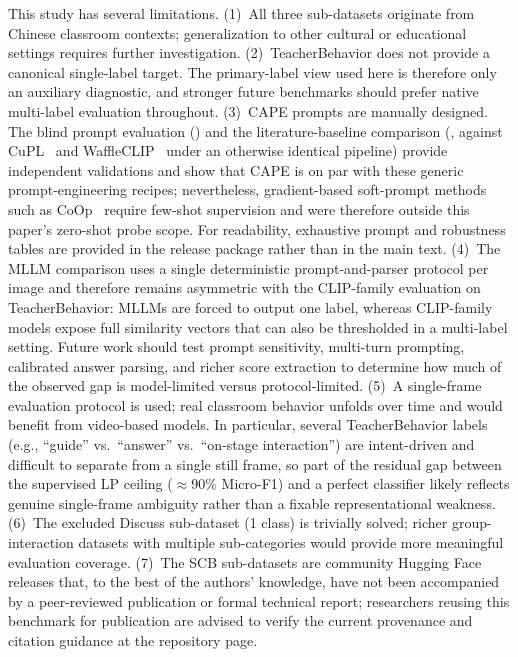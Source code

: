 \documentclass[electronics,article,submit,pdftex,moreauthors]{Definitions/mdpi}
\begin{document}
This study has several limitations.
\label{sec:limitations}
(1)~All three sub-datasets originate from Chinese classroom contexts; generalization to other cultural or educational settings requires further investigation.
(2)~TeacherBehavior does not provide a canonical single-label target. The primary-label view used here is therefore only an auxiliary diagnostic, and stronger future benchmarks should prefer native multi-label evaluation throughout.
(3)~CAPE prompts are manually designed. The blind prompt evaluation () and the literature-baseline comparison (, against CuPL~\cite{pratt2023cupl} and WaffleCLIP~\cite{roth2023waffleclip} under an otherwise identical pipeline) provide independent validations and show that CAPE is on par with these generic prompt-engineering recipes; nevertheless, gradient-based soft-prompt methods such as CoOp~\cite{zhou2022learning} require few-shot supervision and were therefore outside this paper's zero-shot probe scope. For readability, exhaustive prompt and robustness tables are provided in the release package rather than in the main text.
(4)~The MLLM comparison uses a single deterministic prompt-and-parser protocol per image and therefore remains asymmetric with the CLIP-family evaluation on TeacherBehavior: MLLMs are forced to output one label, whereas CLIP-family models expose full similarity vectors that can also be thresholded in a multi-label setting. Future work should test prompt sensitivity, multi-turn prompting, calibrated answer parsing, and richer score extraction to determine how much of the observed gap is model-limited versus protocol-limited.
(5)~A single-frame evaluation protocol is used; real classroom behavior unfolds over time and would benefit from video-based models. In particular, several TeacherBehavior labels (e.g., ``guide'' vs.\ ``answer'' vs.\ ``on-stage interaction'') are intent-driven and difficult to separate from a single still frame, so part of the residual gap between the supervised LP ceiling ($\approx$90\% Micro-F1) and a perfect classifier likely reflects genuine single-frame ambiguity rather than a fixable representational weakness.
(6)~The excluded Discuss sub-dataset (1 class) is trivially solved; richer group-interaction datasets with multiple sub-categories would provide more meaningful evaluation coverage.
(7)~The SCB sub-datasets are community Hugging Face releases that, to the best of the authors' knowledge, have not been accompanied by a peer-reviewed publication or formal technical report; researchers reusing this benchmark for publication are advised to verify the current provenance and citation guidance at the repository page.
\end{document}
